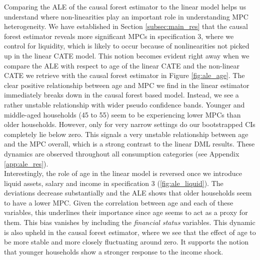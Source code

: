 Comparing the ALE of the causal forest estimator to the linear model helps us understand where non-linearities play an important role in understanding MPC heterogeneity. We have established in Section \ref{subsec:main_res} that the causal forest estimator reveals more significant MPCs in specification 3, where we control for liquidity, which is likely to occur because of nonlinearities not picked up in the linear CATE model. This notion becomes evident right away when we compare the ALE with respect to age of the linear CATE and the non-linear CATE we retrieve with the causal forest estimator in Figure \ref{fig:ale_age}. The clear positive relationship between age and MPC we find in the linear estimator immediately breaks down in the causal forest based model. Instead, we see a rather unstable relationship with wider pseudo confidence bands. Younger and middle-aged households (45 to 55) seem to be experiencing lower MPCs than older households. However, only for very narrow settings do our bootstrapped CIs completely lie below zero. This signals a very unstable relationship between age and the MPC overall, which is a strong contrast to the linear DML results. These dynamics are observed throughout all consumption categories (see Appendix \ref{app:ale_res}). \\
\noindent Interestingly, the role of age in the linear model is reversed once we introduce liquid assets, salary and income in specification 3 (\ref{fig:ale_liquid}). The deviations decrease substantially and the ALE shows that older households seem to have a lower MPC. Given the correlation between age and each of these variables, this underlines their importance since age seems to act as a proxy for them. This bias vanishes by including the \textit{financial status} variables. This dynamic is also upheld in the causal forest estimator, where we see that the effect of age to be more stable and more closely fluctuating around zero. It supports the notion that younger households show a stronger response to the income shock. \\
